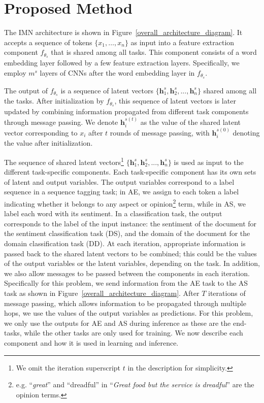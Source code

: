 \documentclass[11pt,a4paper]{article}
\begin{document}
\section{Proposed Method}
The IMN architecture is shown in Figure~\ref{overall_architecture_diagram}. It accepts a sequence of tokens $\{x_1,\ldots,x_n\}$ as input into a feature extraction component $f_{\theta_s}$ that is shared among all tasks. This component consists of a word embedding layer followed by a few feature extraction layers. Specifically, we employ $m^s$ layers of CNNs after the word embedding layer in $f_{\theta_s}$.

The output of $f_{\theta_s}$ is a sequence of latent vectors $\{\mathbf{h}^s_{1}, \mathbf{h}^s_{2}, ..., \mathbf{h}^s_{n}\}$ shared among all the tasks. After initialization by $f_{\theta_s}$, this sequence of latent vectors is later updated by combining information propagated from different task components through message passing. We denote $\mathbf{h}^{s(t)}_i$ as the value of the shared latent vector corresponding to $x_i$ after $t$ rounds of message passing, with $\mathbf{h}^{s(0)}_i$ denoting the value after initialization. 

The sequence of shared latent vectors\footnote{We omit the iteration superscript $t$ in the description for simplicity.} $\{\mathbf{h}^s_{1}, \mathbf{h}^s_{2}, ..., \mathbf{h}^s_{n}\}$ is used as input to the different task-specific components. Each task-specific component has its own sets of latent and output variables. The output variables correspond to a label sequence in a sequence tagging task; in AE, we assign to each token a label indicating whether it belongs to any aspect or opinion\footnote{e.g. ``\emph{great}'' and ``dreadful'' in ``\emph{Great food but the service is dreadful}'' are the opinion terms.} term, while in AS, we label each word with its sentiment. 
In a classification task, the output corresponds to the label of the input instance: the sentiment of the document for the sentiment classification task (DS), and the domain of the document for the domain classification task (DD). At each iteration, appropriate information is passed back to the shared latent vectors to be combined; this could be the values of the output variables or the latent variables, depending on the task. In addition, we also allow messages to be passed between the components in each iteration. Specifically for this problem, we send information from the AE task to the AS task as shown in Figure~\ref{overall_architecture_diagram}. After $T$ iterations of message passing, which allows information to be propagated through multiple hops, we use the values of the output variables as predictions. For this problem, we only use the outputs for AE and AS during inference as these are the end-tasks, while the other tasks are only used for training.
We now describe each component and how it is used in learning and inference. 
\end{document}
